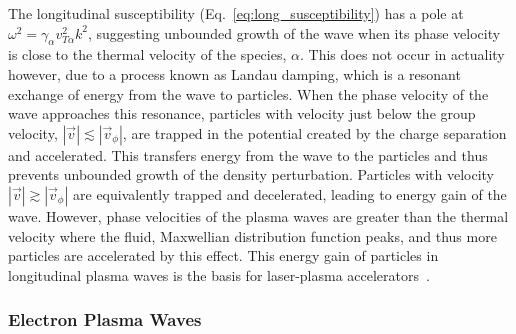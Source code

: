 The longitudinal susceptibility (Eq.~\ref{eq:long_susceptibility}) has a pole at $\omega^2 = \gamma_\alpha v_{T\alpha}^2 k^2$, suggesting unbounded growth of the wave when its phase velocity is close to the thermal velocity of the species, $\alpha$.
This does not occur in actuality however, due to a process known as Landau damping, which is a resonant exchange of energy from the wave to particles.
When the phase velocity of the wave approaches this resonance, particles with velocity just below the group velocity, $|\vec{v}|\lesssim|\vec{v}_\phi|$, are trapped in the potential created by the charge separation and accelerated.
This transfers energy from the wave to the particles and thus prevents unbounded growth of the density perturbation.
Particles with velocity $|\vec{v}|\gtrsim|\vec{v}_\phi|$ are equivalently trapped and decelerated, leading to energy gain of the wave.
However, phase velocities of the plasma waves are greater than the thermal velocity where the fluid, Maxwellian distribution function peaks, and thus more particles are accelerated by this effect.
This energy gain of particles in longitudinal plasma waves is the basis for laser-plasma accelerators~\cite{tajima_laser_1979,esarey_physics_2009}.

\subsubsection{Electron Plasma Waves}%
\label{sec:theory_EPWs}

